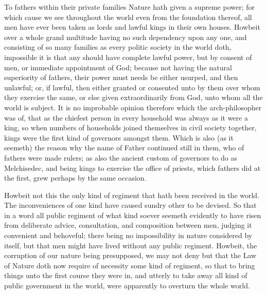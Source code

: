 To fathers within their private families Nature hath given a supreme power; for which cause we see throughout the world even from the foundation thereof, all men have ever been taken as lords and lawful kings in their own houses. Howbeit over a whole grand multitude having no such dependency upon any one, and consisting of so many families as every politic society in the world doth, impossible it is that any should have complete lawful power, but by consent of men, or immediate appointment of God; because not having the natural superiority of fathers, their power must needs be either usurped, and then unlawful; or, if lawful, then either granted or consented unto by them over whom they exercise the same, or else given extraordinarily from God, unto whom all the world is subject. It is no improbable opinion therefore which the arch-philosopher was of, that as the chiefest person  in every household was always as it were a king, so when numbers of households joined themselves in civil society together, kings were the first kind of governors amongst them. Which is also (as it seemeth) the reason why the name of Father continued still in them, who of fathers were made rulers; as also the ancient custom of governors to do as Melchisedec, and being kings to exercise the office of priests, which fathers did at the first, grew perhaps by the same occasion.

Howbeit not this the only kind of regiment that hath been received in the world. The inconveniences of one kind have caused sundry other to be devised. So that in a word all public regiment of what kind soever seemeth evidently to have risen from deliberate advice, consultation, and composition between men, judging it convenient and behoveful; there being no impossibility in nature considered by itself, but that men might have lived without any public regiment. Howbeit, the corruption of our nature being presupposed, we may not deny but that the Law of Nature doth now require of necessity some kind of regiment, so that to bring things unto the first course they were in, and utterly to take away all kind of public government in the world, were apparently to overturn the whole world.

